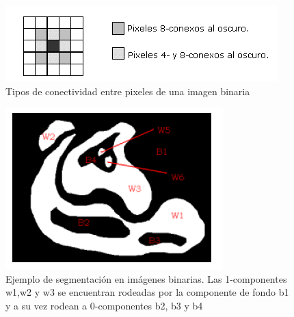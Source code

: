 	\begin{figure}[tpb]
\begin{center}
  \includegraphics[scale=0.6]{vision/figures/48conexos.png}
\end{center}
  \caption[Tipos de conectividad entre pixeles]{\small Tipos de conectividad entre pixeles de una imagen binaria}
  \label{fig:conectividad}
\end{figure}

\begin{figure}[tpb]
\begin{center}
  \includegraphics[scale=0.6]{vision/figures/zonas-contours.png}
\end{center}
  \caption[Ejemplo de segmentaci\'on en im\'agenes binarias]{\small Ejemplo de segmentaci\'on en im\'agenes binarias. Las 1-componentes w1,w2 y w3 se encuentran rodeadas por la componente de fondo b1 y a su vez
  rodean a 0-componentes b2, b3 y b4 }
  \label{fig:contours}
\end{figure}
	
	
